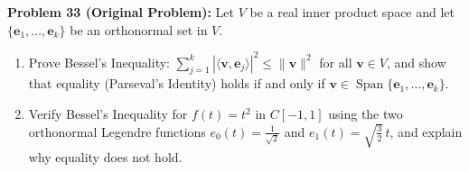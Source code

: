 \documentclass[11pt, letterpaper]{article}
\theoremstyle{definition}
\theoremstyle{remark}
\begin{document}
\medskip

\textbf{Problem 33 (Original Problem):} Let $V$ be a real inner product space and let $\{\mathbf{e}_1, \dots, \mathbf{e}_k\}$ be an orthonormal set in $V$.
\begin{enumerate}[label=(\alph*)]
    \item Prove Bessel's Inequality: $\sum_{j=1}^k |\langle \mathbf{v}, \mathbf{e}_j \rangle|^2 \le \|\mathbf{v}\|^2$ for all $\mathbf{v} \in V$, and show that equality (Parseval's Identity) holds if and only if $\mathbf{v} \in \operatorname{Span}\{\mathbf{e}_1, \dots, \mathbf{e}_k\}$.
    \item Verify Bessel's Inequality for $f(t) = t^2$ in $C[-1, 1]$ using the two orthonormal Legendre functions $e_0(t) = \frac{1}{\sqrt{2}}$ and $e_1(t) = \sqrt{\frac{3}{2}}\,t$, and explain why equality does not hold.
\end{enumerate}
\end{document}
